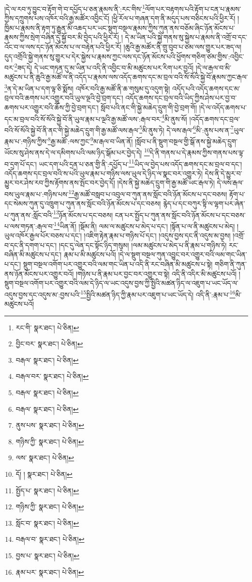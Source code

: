 །དེ་ལ་རབ་ཏུ་བྱུང་བ་རྟོག་གེ་བ་དཔྱོད་པ་ཅན་རྣམས་ནི་:རང་གིས་\footnote{རང་གི་  སྣར་ཐང་།  པེ་ཅིན། }ལོག་པར་བརྟགས་པའི་རྟོག་པ་ངན་པ་རྣམས་ཀྱིས་དཀྲུགས་པས་འཁོར་བའི་རྒྱ་མཚོར་འབྱིང་ངོ། །ཕྱི་རོལ་པ་གཞན་དག་ནི་མདུད་པས་བཅིངས་པའི་ཕྱིར་རོ། །ཁྱིམ་པ་རྣམས་ནི་རྟག་ཏུ་རྒྱུན་མི་འཆད་པར་ཡང་སྡུག་བསྔལ་རྣམས་ཀྱིས་ཀུན་ནས་བཅོམ་ཞིང་ཉོན་མོངས་པ་རྣམས་ཀྱིས་སྲེག་བཞིན་དུ་སྐྱོ་བར་མི་བྱེད་པའི་ཕྱིར་རོ། །
དེ་མ་ཡིན་པའི་སྐྱེ་གནས་སུ་སྐྱེས་པ་རྣམས་ནི་འགྲོ་བ་དང་འོང་བ་ལ་ལས་དང་ཉོན་མོངས་པ་ལ་བརྟེན་པའི་ཕྱིར་རོ། །ཆུའི་རྒྱ་མཚོར་ནི་གྲུ་བུབ་པ་ཙམ་ལས་གྱུར་པར་ཟད་ལ། དུད་འགྲོའི་སྐྱེ་གནས་སུ་གྱུར་པ་དེར་སྐྱེས་པ་རྣམས་ཀྱང་ལས་དང་ཉོན་མོངས་པའི་ཕྱོགས་གཅིག་ཙམ་གྱིས་:འབྱིང་བར་\footnote{བྱིང་བར་  སྣར་ཐང་།  པེ་ཅིན། }ཟད་དེ། དེ་ཡང་གཏན་དུ་མ་ཡིན་པ་འདི་ནི་འབྱིང་བ་མི་མཚུངས་པར་རིག་པར་བྱའོ། །དེ་ལ་རྒལ་བ་མི་མཚུངས་པ་ནི་ཆུའི་རྒྱ་མཚོ་ལ་ནི་འདོད་པ་རྣམས་ལས་འདོད་ཆགས་དང་མ་བྲལ་བའི་སོ་སོའི་སྐྱེ་བོ་རྣམས་ཀྱང་རྒལ་\footnote{བརྒལ་  སྣར་ཐང་།  པེ་ཅིན། }ན་དེ་མ་ཡིན་པ་དག་ལྟ་ཅི་སྨོས། འཁོར་བའི་རྒྱ་མཚོ་ནི་ཆ་གསུམ་དུ་འདུག་སྟེ། འདོད་པའི་འདོད་ཆགས་དང་མ་བྲལ་བའི་ཆགས་པར་འགྱུར་བའི་ཡུལ་ལྔའི་བྱེ་བྲག་དང་། འདོད་ཆགས་དང་བྲལ་བའི་ཡིད་ཀྱིས་ཤེས་པར་བྱ་བ་ཆགས་པར་འགྱུར་བའི་ཆོས་ཀྱི་བྱེ་བྲག་དང་། སློབ་པའི་ནང་གི་སྐྱེ་མཆེད་དྲུག་གི་བྱེ་བྲག་གོ། །དེ་ལ་འདོད་ཆགས་པ་དང་མ་བྲལ་བའི་སོ་སོའི་སྐྱེ་བོ་ནི་ཡུལ་རྣམ་པ་ལྔའི་རྒྱ་མཚོ་ལས་:རྒལ་བར་\footnote{བརྒལ་བར་  སྣར་ཐང་།  པེ་ཅིན། }མི་ནུས་སོ། །འདོད་ཆགས་དང་བྲལ་བའི་སོ་སོའི་སྐྱེ་བོ་ནི་ནང་གི་སྐྱེ་མཆེད་དྲུག་གི་རྒྱ་མཚོ་ལས་རྒལ་\footnote{བརྒལ་  སྣར་ཐང་།  པེ་ཅིན། }མི་ནུས་ཏེ། དེ་ལས་རྒལ་\footnote{བརྒལ་  སྣར་ཐང་།  པེ་ཅིན། }མི་:ནུས་པས་ན་\footnote{ནུས་པས་  སྣར་ཐང་།  པེ་ཅིན། }ཡུལ་རྣམ་པ་:གཉིས་ཀྱིས་\footnote{གཉིས་ཀྱི་  སྣར་ཐང་།  པེ་ཅིན། }རྒྱ་མཚོ་:ལས་ཀྱང་\footnote{ལས་  སྣར་ཐང་།  པེ་ཅིན། }མ་རྒལ་བ་ཡིན་ནོ། །སློབ་པ་ནི་སྡུག་བསྔལ་གྱི་སྒོ་ནས་སྐྱེ་མཆེད་དྲུག་ཡོངས་སུ་ཤེས་ནས་དེ་ལ་དམིགས་པའི་ལམ་ཉིད་སྒོམ་པར་བྱེད་དེ། \footnote{དོ། །   སྣར་ཐང་།  པེ་ཅིན། }དེ་ནི་གནས་པ་དེ་རྣམས་ཀྱིས་གནས་པས་ལྟ་བ་དྲག་པོ་དང་། ཡང་དག་པའི་དྲན་པ་ཅན་གྱི་ནི་:དཔྱོད་པ་\footnote{སྤྱོད་པ་  སྣར་ཐང་།  པེ་ཅིན། }ཡིད་ལ་བྱེད་པས་འདོད་ཆགས་དང་མ་བྲལ་བ་དང་། འདོད་ཆགས་དང་བྲལ་བའི་ས་པའི་ཡུལ་རྣམ་པ་གཉིས་ལས་ཡུལ་དེ་ཉིད་ལ་སྣང་བར་འགྱུར་ཏེ། དེས་ནི་དེ་མྱུར་བ་མྱུར་བར་ཤེས་རབ་ཀྱིས་རྟོགས་ནས་སྤོང་བར་བྱེད་དོ། །དེས་ནི་སྐྱེ་མཆེད་དྲུག་གི་རྒྱ་མཚོ་ཡང་རྒལ་ཏེ། དེ་ལས་རྒལ་བས་ཡུལ་རྣམ་པ་:གཉིས་པས་\footnote{གཉིས་ཀྱི་  སྣར་ཐང་།  པེ་ཅིན། }རྒྱ་མཚོ་བསླབ་པ་འབུལ་བ་ཀུན་ནས་སློང་བའི་ཉོན་མོངས་པ་དང་བཅས། རྟོག་པ་དང་སེམས་ཀུན་དུ་འཁྲུག་པ་ཀུན་ནས་སློང་བའི་ཉོན་མོངས་པ་དང་བཅས། རྙེད་པ་དང་བཀུར་སྟི་ལ་ལྷག་པར་ཞེན་པ་ཀུན་ནས་:སློང་བའི་\footnote{སློང་བ་  སྣར་ཐང་།  པེ་ཅིན། }ཉོན་མོངས་པ་དང་བཅས། ངན་པར་སྤྱོད་པ་ཀུན་ནས་སློང་བའི་ཉོན་མོངས་པ་དང་བཅས་པ་ལས་གཏན་:རྒལ་བ་\footnote{བརྒལ་བ་  སྣར་ཐང་།  པེ་ཅིན། }ཡིན་ནོ། །སྡོམ་ནི། ལམ་ལ་མཚུངས་པ་མེད་པ་དང་། །སྟོན་པ་ལ་ནི་མཚུངས་པ་མེད། །ཡུལ་འཁོར་རྒྱལ་པོར་བཅས་པ་དང་། །འཇིག་རྟེན་རྣམ་པ་གཉིས་པོ་དང་། །འདུས་བྱས་དང་ནི་འདུས་མ་བྱས། །འགྲོ་བ་དང་ནི་དགག་པ་དང་། །དང་དུ་ལེན་དང་སྟོང་ཉིད་གསུམ། །ལམ་མཚུངས་པ་མེད་པ་ནི་རྣམ་པ་གཉིས་ཏེ། རང་བཞིན་མི་མཚུངས་པ་དང་། རྣམ་པ་མི་མཚུངས་པའོ། །དེ་ལ་སྡུག་བསྔལ་ཀུན་འབྱུང་བར་འགྱུར་བའི་ལམ་གང་ཡིན་པ་དང་། སྡུག་བསྔལ་འགོག་པར་འགྱུར་བའི་ལམ་གང་ཡིན་པ་འདི་ནི་རང་བཞིན་མི་མཚུངས་པ་སྟེ། གཅིག་ནི་ཀུན་ནས་ཉོན་མོངས་པར་འགྱུར་བའོ། །གཉིས་པ་ནི་རྣམ་པར་བྱང་བར་འགྱུར་བ་སྟེ། འདི་ནི་འདིར་མི་མཚུངས་པའོ། །སྡུག་བསྔལ་འགོག་པར་འགྱུར་བའི་ལམ་དེ་ཉིད་ལ་ཡང་འདུས་བྱས་ཀྱི་སྤྱིའི་མཚན་ཉིད་ལ་འཇུག་པ་ཡང་ཡོད་ལ་འདུས་བྱས་དང་འདུས་མ་:བྱས་པའི་\footnote{བྱས་པ་  སྣར་ཐང་།  པེ་ཅིན། }སྤྱིའི་མཚན་ཉིད་ཀྱི་རྣམ་པར་འཇུག་པ་ཡང་ཡོད་དེ། འདི་ནི་:རྣམ་པ་\footnote{རྣམ་པར་  སྣར་ཐང་།  པེ་ཅིན། }མི་མཚུངས་པའོ། 